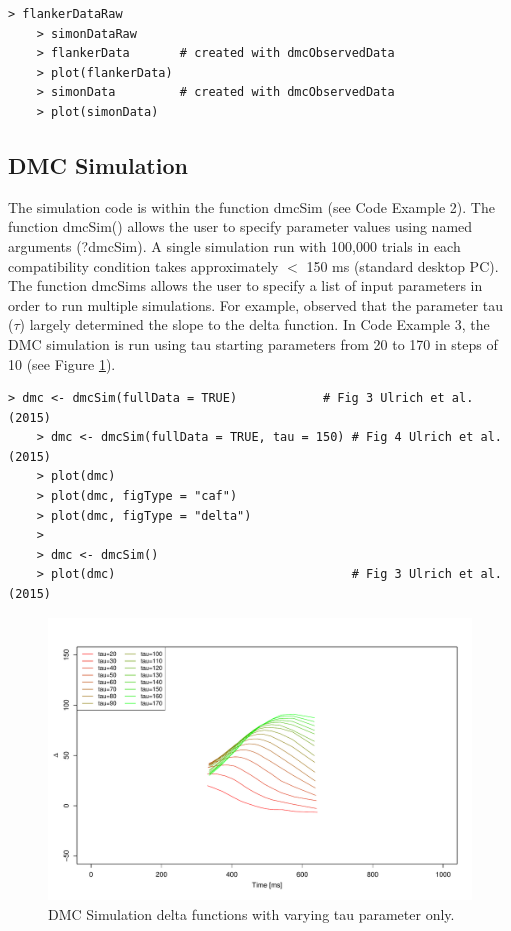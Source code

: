 \begin{minipage}{\linewidth}
    \begin{lstlisting}[style = R, title={R Code Example 2: Example Data}, captionpos=t]
    > flankerDataRaw 
    > simonDataRaw 
    > flankerData       # created with dmcObservedData
    > plot(flankerData) 
    > simonData         # created with dmcObservedData
    > plot(simonData) 
    \end{lstlisting}
\end{minipage}

\subsection{DMC Simulation}
\label{dmc_simulation}
The simulation code is within the function dmcSim (see Code Example 2). The
function dmcSim() allows the user to specify parameter values using named
arguments (?dmcSim). A single simulation run with 100,000 trials in each
compatibility condition takes approximately $<$ 150 ms (standard desktop PC).
The function dmcSims allows the user to specify a list of input parameters in
order to run multiple simulations. For example, \textcite{ulrich2015automatic}
observed that the parameter tau ($\tau$) largely determined the slope to the
delta function. In Code Example 3, the DMC simulation is run using tau starting
parameters from 20 to 170 in steps of 10 (see Figure \ref{fig:2}).

\begin{minipage}{\linewidth}
    \begin{lstlisting}[style = R, title = {R Code Example 2}, captionpos = t]
    > dmc <- dmcSim(fullData = TRUE)            # Fig 3 Ulrich et al. (2015)
    > dmc <- dmcSim(fullData = TRUE, tau = 150) # Fig 4 Ulrich et al. (2015)
    > plot(dmc)
    > plot(dmc, figType = "caf")    
    > plot(dmc, figType = "delta")
    > 
    > dmc <- dmcSim()                            
    > plot(dmc)                                 # Fig 3 Ulrich et al. (2015)
    \end{lstlisting}
\end{minipage}

\begin{figure}
    \includegraphics[width=1\textwidth]{../figures/figure4.pdf}
    \caption{DMC Simulation delta functions with varying tau parameter only.}
    \label{fig:2}
\end{figure}

